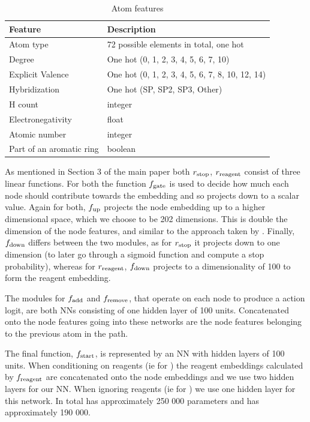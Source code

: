 \documentclass{article}
\begin{document}
\begin{table}
  \caption{Atom features}
  \label{table:atom-features}
  \centering
  \begin{tabular}{ll}
    \toprule
    Feature     & Description      \\
    \midrule
    Atom type & 72 possible elements in total, one hot  \\
    Degree     & One hot (0,   1,   2,   3,   4,   5,   6,   7,  10)  \\
    Explicit Valence     & One hot   (0,   1,   2,   3,   4,   5,   6,   7,   8,  10,  12,  14)    \\
    Hybridization & One hot (SP, SP2, SP3, Other) \\
    H count & integer \\
    Electronegativity & float \\
    Atomic number & integer \\
    Part of an aromatic ring & boolean\\
    \bottomrule
  \end{tabular}
\end{table}

As mentioned in Section 3 of the main paper both $r_{\textrm{stop}}$, $r_\mathrm{reagent}$ consist of three
linear functions. 
For  both the function $f_\textrm{gate}$ is used to decide how much each node should contribute towards the embedding and so projects down to a scalar value.
Again for both, $f_\textrm{up}$ projects the node embedding up to a higher dimensional space, which we choose to be 202 dimensions. 
This is double the dimension of the node features, and similar to the approach taken by \citet[\S B.1]{li2018learning}.
Finally, $f_\textrm{down}$ differs between the two modules, as for $r_{\textrm{stop}}$ it projects down to one dimension (to later go through a sigmoid function and compute a stop probability), whereas for  $r_\mathrm{reagent}$, $f_\textrm{down}$ projects  to a dimensionality of 100 to form the reagent embedding.


The modules for $f_{\textrm{add}}$ and $f_{\textrm{remove}}$, that operate on each node to produce a action logit, are both NNs consisting of one hidden layer of 100 units. 
Concatenated onto the node features going into these networks are the node features belonging to the previous atom in the path.



The final function, $f_{\textrm{start}}$, is represented by an NN with hidden layers of 100 units. 
When conditioning on reagents (ie for
 \ourModelR
 )
  the reagent embeddings calculated by $f_{\textrm{reagent}}$ are concatenated onto the node embeddings and we use two hidden layers for our NN. When ignoring reagents (ie for \ourModelIR) we use one hidden layer for this network. In total \ourModelR has approximately 250 000 parameters and \ourModelIR has approximately 190 000.
\end{document}
